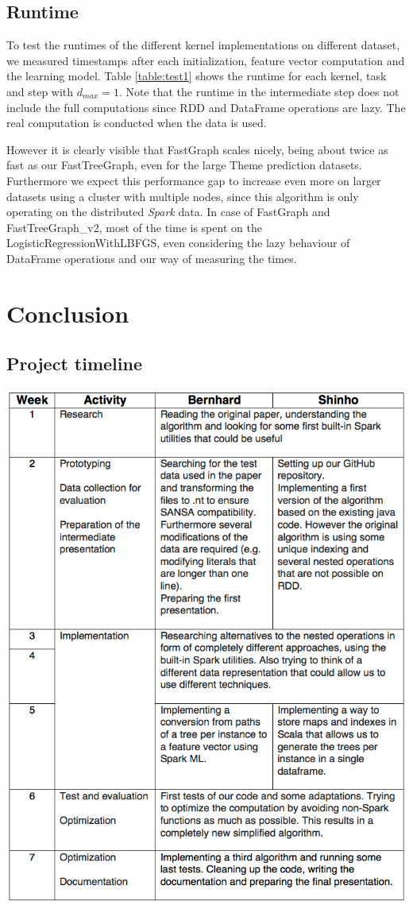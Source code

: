 \documentclass{easychair}
\begin{document}
\subsection{Runtime}
To test the runtimes of the different kernel implementations on different dataset, we measured timestamps after each initialization, feature vector computation and the learning model. Table \ref{table:test1} shows the runtime for each kernel, task and step with $d_{max}=1$. Note that the runtime in the intermediate step does not include the full computations since RDD and DataFrame operations are lazy. The real computation is conducted when the data is used. 

However it is clearly visible that FastGraph scales nicely, being about twice as fast as our FastTreeGraph, even for the large Theme prediction datasets. Furthermore we expect this performance gap to increase even more on larger datasets using a cluster with multiple nodes, since this algorithm is only operating on the distributed \textit{Spark} data. In case of FastGraph and FastTreeGraph\_v2, most of the time is spent on the LogisticRegressionWithLBFGS, even considering the lazy behaviour of DataFrame operations and our way of measuring the times.
\section{Conclusion}
\label{sect:Conclusion}

\subsection{Project timeline}
\includegraphics[width=14cm]{Timeline.png}
\end{document}

